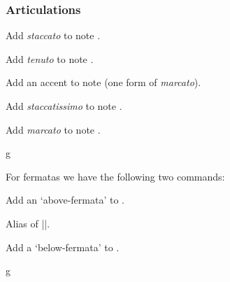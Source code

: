 \subsubsection{Articulations}\label{sec:music-notes:misc:articulations}
\begin{command}{\tmstaccato{}}
  Add \emph{staccato} to note .
\end{command}
\begin{command}{\tmtenuto{}}
  Add \emph{tenuto} to note .
\end{command}
\begin{command}{\tmaccentabove{}}
  Add an accent to note  (one form of \emph{marcato}).
\end{command}
\begin{command}{\tmstaccatissimo{}}
  Add \emph{staccatissimo} to note .
\end{command}
\begin{command}{\tmmarcato{}}
  Add \emph{marcato} to note .
\end{command}
\begin{codeexample}[]
\begin{tmline}
\begin{tmstaff}{g}{}
\end{tmstaff}
\end{tmline}
\end{codeexample}
For fermatas we have the following two commands:
\begin{command}{\tmfermataabove{}}
  Add an `above-fermata' to .
\end{command}
\begin{command}{\tmfermata{}}
  Alias of |\tmfermataabove|.
\end{command}
\begin{command}{\tmfermatabelow{}}
  Add a `below-fermata' to .
\end{command}
\begin{codeexample}[]
\begin{tmline}
\begin{tmstaff}{g}{}
\end{tmstaff}
\end{tmline}
\end{codeexample}
